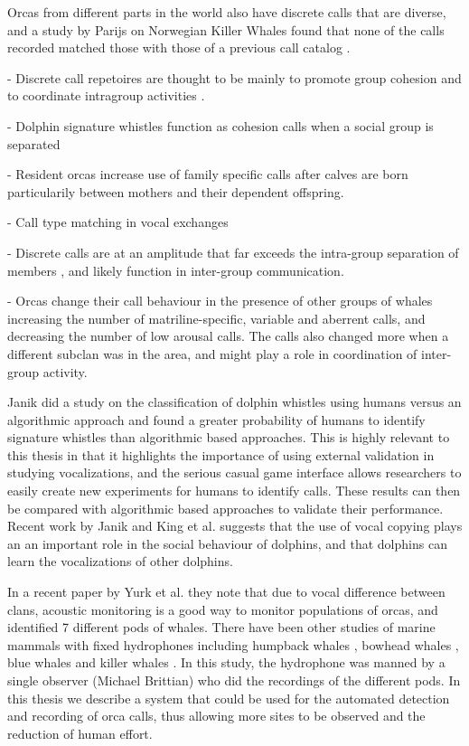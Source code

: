 Orcas from different parts in the world also have discrete calls that
are diverse, and a study by Parijs \cite{parijs04} on Norwegian Killer
Whales found that none of the calls recorded matched those with those
of a previous call catalog \cite{strager95}.


- Discrete call repetoires are thought to be mainly to promote group
cohesion and to coordinate intragroup activities \cite{ford89}
\cite{ford91}.

- Dolphin signature whistles function as cohesion calls when a social
group is separated \cite{janik98} \cite{watwood05}

- Resident orcas increase use of family specific calls after calves
are born \cite{weiss06} particularily between mothers and their
dependent offspring.

- Call type matching in vocal exchanges \cite{miller04}

- Discrete calls are at an amplitude that far exceeds the intra-group
separation of members \cite{miller06}, and likely function in
inter-group communication. 

- Orcas change their call behaviour in the presence of other groups of
whales \cite{weiss06} increasing the number of matriline-specific,
variable and aberrent calls, and decreasing the number of low arousal
calls.  The calls also changed more when a different subclan was in
the area, and might play a role in coordination of inter-group
activity.

Janik \cite{janik99} did a study on the classification of dolphin
whistles using humans versus an algorithmic approach and found a
greater probability of humans to identify signature whistles than
algorithmic based approaches.  This is highly relevant to this thesis
in that it highlights the importance of using external validation in
studying vocalizations, and the serious casual game interface allows
researchers to easily create new experiments for humans to identify
calls.  These results can then be compared with algorithmic based
approaches to validate their performance.  Recent work by Janik and
King et al. \cite{king2013} suggests that the use of vocal copying
plays an an important role in the social behaviour of dolphins, and
that dolphins can learn the vocalizations of other dolphins.

In a recent paper by Yurk et al. \cite{yurk10} they note that due to
vocal difference between clans, acoustic monitoring is a good way to
monitor populations of orcas, and identified 7 different pods of
whales.  There have been other studies of marine mammals with fixed
hydrophones including humpback whales \cite{norris99}, bowhead whales
\cite{cummings85}, blue whales \cite{stafford98} and killer whales
\cite{morton02}.  In this study, the hydrophone was manned by a single
observer (Michael Brittian) who did the recordings of the different
pods.  In this thesis we describe a system that could be used for the
automated detection and recording of orca calls, thus allowing more
sites to be observed and the reduction of human effort.





